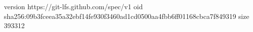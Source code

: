 version https://git-lfs.github.com/spec/v1
oid sha256:09b3fceea35a32ebf14fe930f3460ad1cd0500aa4fbb6ff01168cbca7f849319
size 393312
